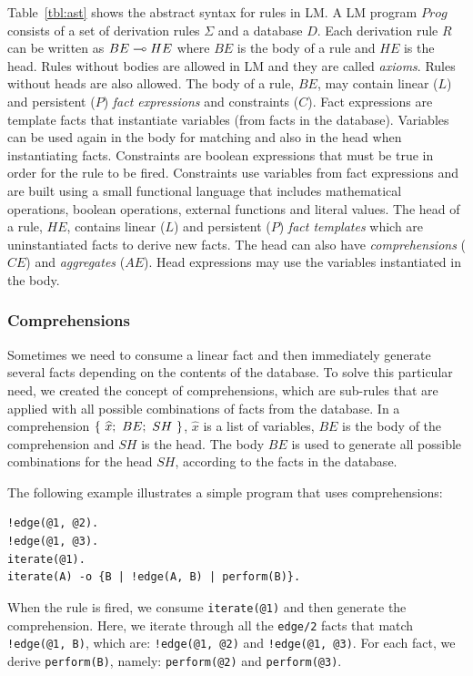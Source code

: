 Table~\ref{tbl:ast} shows the abstract syntax for rules in LM.
A LM program $Prog$ consists of a set of derivation rules $\Sigma$ and a database $D$.
Each derivation rule $R$ can be written as $BE \multimap HE$ where $BE$ is the body of a rule and
$HE$ is the head. Rules without bodies are allowed in LM and they are called \textit{axioms}. Rules without heads are also allowed.
The body of a rule, $BE$, may contain linear ($L$) and persistent ($P$) \emph{fact expressions}
and constraints ($C$). Fact expressions are template facts that instantiate variables
(from facts in the database). Variables can be used again in the body for matching and
also in the head when instantiating facts. Constraints are boolean expressions that must
be true in order for the rule to be fired. Constraints use variables from fact expressions and are built using a small functional language that includes mathematical operations, boolean operations, external functions and literal values.
The head of a rule, $HE$, contains linear ($L$) and persistent ($P$) \emph{fact templates} which are uninstantiated facts to derive new facts. The head can also have \emph{comprehensions} ($CE$) and \emph{aggregates} ($AE$). Head
expressions may use the variables instantiated in the body.

\subsubsection{Comprehensions}

Sometimes we need to consume a linear fact and then immediately generate several facts depending on
the contents of the database. To solve this particular need, we created the concept of comprehensions, which are
sub-rules that are applied with all possible combinations of facts from the database. In a comprehension $\{~\widehat{x};~BE;~SH~\}$,
$\widehat{x}$ is a list of variables, $BE$ is the body of the comprehension and $SH$ is the head.
The body $BE$ is used to generate all possible combinations for the head $SH$, according to the facts
in the database.

The following example illustrates a simple program that uses comprehensions:

{\footnotesize
\begin{Verbatim}
!edge(@1, @2).
!edge(@1, @3).
iterate(@1).
iterate(A) -o {B | !edge(A, B) | perform(B)}.
\end{Verbatim}
}

When the rule is fired, we consume \texttt{iterate(@1)} and then generate the comprehension. Here, we iterate through
all the \texttt{edge/2} facts that match \texttt{!edge(@1, B)}, which are: \texttt{!edge(@1, @2)} and \texttt{!edge(@1, @3)}.
For each fact, we derive \texttt{perform(B)}, namely: \texttt{perform(@2)} and \texttt{perform(@3)}.

